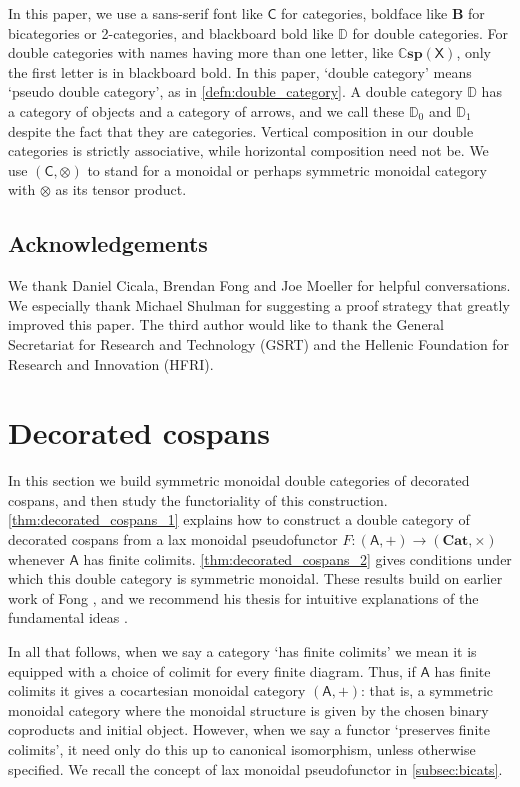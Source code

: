 \documentclass[reqno]{amsart}
\let\maps\colon
\theoremstyle{definition}
\theoremstyle{remark}
\newcommand{\A}{\mathsf{A}}
\newcommand{\C}{\mathsf{C}}
\newcommand{\X}{\mathsf{X}}
\newcommand{\bicat}{\mathbf}
\newcommand{\Cat}{\bicat{Cat}}
\newcommand{\double}[1]{\mathbf{\mathbb #1}}
\newcommand{\lCsp}{\double{Csp}}
\newcommand{\lD}{\double{D}}
\begin{document}
In this paper, we use a sans-serif font like $\C$ for categories, boldface like $\mathbf{B}$ for bicategories or 2-categories, and blackboard bold like $\lD$ for double categories. For double categories with names having more than one letter, like $\lCsp(\X)$, only the first letter is in blackboard bold. In this paper, `double category' means `pseudo double category', as in \cref{defn:double_category}. A double category $\lD$ has a category of objects and a category of arrows, and we call these $\lD_0$ and $\lD_1$ despite the fact that they are categories. Vertical composition in our double categories is strictly associative, while horizontal composition need not be.  We use $(\C,\otimes)$ to stand for a monoidal or perhaps symmetric monoidal category with $\otimes$ as its tensor product.

\subsection*{Acknowledgements}

We thank Daniel Cicala, Brendan Fong and Joe Moeller for helpful conversations.  We especially thank Michael Shulman for suggesting a proof strategy that greatly improved this paper.  The third author would like to thank the General Secretariat for Research  and Technology (GSRT) and the Hellenic Foundation for Research and Innovation (HFRI).

\section{Decorated cospans}\label{DecCospansDoubleCat}

In this section we build symmetric monoidal double categories of decorated cospans, and then study the functoriality of this construction.   \cref{thm:decorated_cospans_1} explains how to construct a double category of decorated cospans from a lax monoidal pseudofunctor $F \maps (\A,+) \to (\Cat, \times)$ whenever $\A$ has finite colimits.  \cref{thm:decorated_cospans_2} gives conditions under which this double category is symmetric monoidal.   These results build on earlier work of Fong \cite{Fong}, and we recommend his thesis for intuitive explanations of the fundamental ideas \cite{FongThesis}.

In all that follows, when we say a category `has finite colimits' we mean it is equipped with a choice of colimit for every finite diagram.   Thus, if $\A$ has finite colimits it gives a cocartesian monoidal category $(\A,+)$: that is, a symmetric monoidal category where the monoidal structure is given by the chosen binary coproducts and initial object.   However, when we say a functor `preserves finite colimits', it need only do this up to canonical isomorphism, unless otherwise specified.   We recall the concept of lax monoidal pseudofunctor in \cref{subsec:bicats}.
\end{document}
